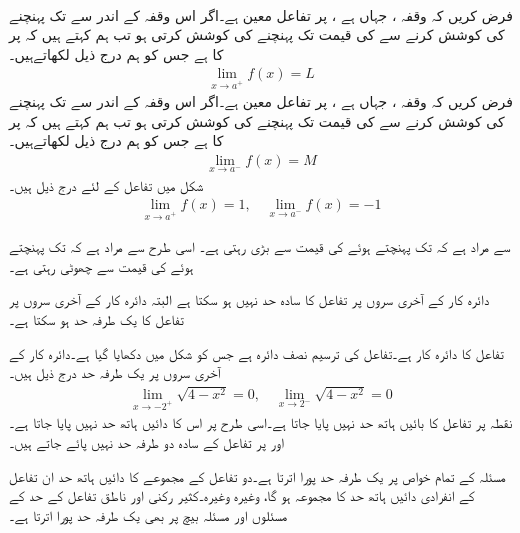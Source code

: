 \\
فرض کریں کہ وقفہ ، جہاں  ہے ، پر تفاعل  معین ہے۔اگر  اس وقفہ کے اندر سے  تک  پہنچنے کی کوشش کرنے سے  کی قیمت  تک پہنچنے کی کوشش کرتی ہو تب ہم کہتے ہیں کہ  پر  کا   ہے جس کو ہم درج ذیل لکھاتےہیں۔
\begin{align*}
\lim\limits_{x\to a^+} f(x)=L
\end{align*}
فرض کریں کہ وقفہ ، جہاں  ہے ، پر تفاعل  معین ہے۔اگر  اس وقفہ کے اندر سے  تک  پہنچنے کی کوشش کرنے سے  کی قیمت  تک پہنچنے کی کوشش کرتی ہو تب ہم کہتے ہیں کہ  پر  کا   ہے جس کو ہم درج ذیل لکھاتےہیں۔
\begin{align*}
\lim\limits_{x\to a^-} f(x)=M
\end{align*}
شکل  میں تفاعل  کے لئے درج ذیل ہیں۔
\begin{align*}
\lim\limits_{x\to a^+} f(x)=1,\quad \lim\limits_{x\to a^-} f(x)=-1
\end{align*}

 سے مراد ہے کہ   تک پہنچتے ہوئے  کی قیمت  سے بڑی رہتی ہے۔ اسی طرح  سے مراد ہے کہ   تک پہنچتے ہوئے  کی قیمت  سے چھوٹی رہتی ہے۔ 

دائرہ کار کے آخری سروں پر تفاعل کا سادہ حد نہیں ہو سکتا ہے البتہ دائرہ کار کے آخری سروں پر تفاعل کا یک طرفہ حد  ہو سکتا ہے۔

تفاعل  کا دائرہ کار  ہے۔تفاعل کی ترسیم نصف دائرہ ہے جس کو شکل  میں دکھایا گیا ہے۔دائرہ کار کے آخری سروں پر یک طرفہ حد درج ذیل ہیں۔
\begin{align*}
\lim\limits_{x\to -2^+} \sqrt{4-x^2}=0,\quad  \lim\limits_{x\to 2^-} \sqrt{4-x^2}=0
\end{align*}
نقطہ  پر تفاعل کا بائیں ہاتھ حد نہیں پایا جاتا ہے۔اسی طرح  پر اس کا دائیں ہاتھ حد نہیں پایا جاتا ہے۔ اور  پر تفاعل کے سادہ دو طرفہ حد نہیں پائے جاتے ہیں۔

مسئلہ  کے تمام خواص پر یک طرفہ حد پورا اترتا ہے۔دو تفاعل کے مجموعے کا دائیں ہاتھ حد  ان تفاعل  کے انفرادی دائیں ہاتھ حد کا مجموعہ ہو گا، وغیرہ وغیرہ۔کثیر رکنی اور ناطق تفاعل کے حد کے مسئلوں اور مسئلہ بیچ  پر بھی یک طرفہ حد پورا اترتا ہے۔  


